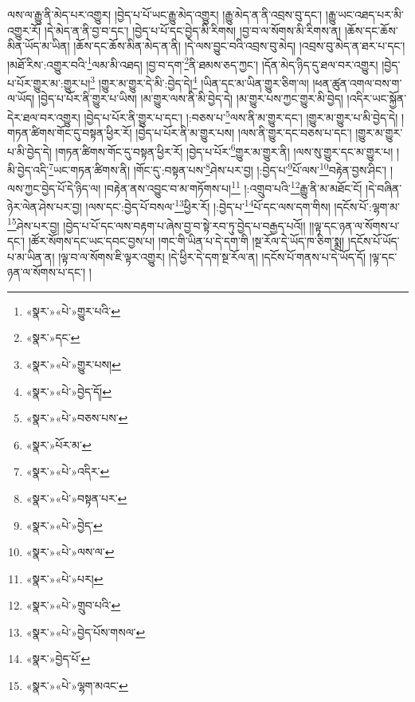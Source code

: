 ལས་ལ་རྒྱུ་ནི་མེད་པར་འགྱུར། །བྱེད་པ་པོ་ཡང་རྒྱུ་མེད་འགྱུར། །རྒྱུ་མེད་ན་ནི་འབྲས་བུ་དང་། །རྒྱུ་ཡང་འཐད་པར་མི་འགྱུར་རོ། །དེ་མེད་ན་ནི་བྱ་བ་དང་། །བྱེད་པ་པོ་དང་བྱེད་མི་རིགས། །བྱ་བ་ལ་སོགས་མི་རིགས་ན། །ཆོས་དང་ཆོས་མིན་ཡོད་མ་ཡིན། །ཆོས་དང་ཆོས་མིན་མེད་ན་ནི། །དེ་ལས་བྱུང་བའི་འབྲས་བུ་མེད། །འབྲས་བུ་མེད་ན་ཐར་པ་དང་། །མཐོ་རིས་:འགྱུར་བའི་\footnote{«སྣར་»«པེ་»གྱུར་པའི་}ལམ་མི་འཐད། །བྱ་བ་དག་\footnote{«སྣར་»དང་}ནི་ཐམས་ཅད་ཀྱང་། །དོན་མེད་ཉིད་དུ་ཐལ་བར་འགྱུར། །བྱེད་པ་པོར་གྱུར་མ་:གྱུར་པ།\footnote{«སྣར་»«པེ་»གྱུར་པས།} །གྱུར་མ་གྱུར་དེ་མི་:བྱེད་དེ།\footnote{«སྣར་»«པེ་»བྱེད་དོ།} །ཡིན་དང་མ་ཡིན་གྱུར་ཅིག་ལ། །ཕན་ཚུན་འགལ་བས་ག་ལ་ཡོད། །བྱེད་པ་པོར་ནི་གྱུར་པ་ཡིས། །མ་གྱུར་ལས་ནི་མི་བྱེད་དེ། །མ་གྱུར་པས་ཀྱང་གྱུར་མི་བྱེད། །འདིར་ཡང་སྐྱོན་དེར་ཐལ་བར་འགྱུར། །བྱེད་པ་པོར་ནི་གྱུར་པ་དང་། །:བཅས་པ་\footnote{«སྣར་»«པེ་»བཅས་པས་}ལས་ནི་མ་གྱུར་དང་། །གྱུར་མ་གྱུར་པ་མི་བྱེད་དེ། །གཏན་ཚིགས་གོང་དུ་བསྟན་ཕྱིར་རོ། །བྱེད་པ་པོར་ནི་མ་གྱུར་པས། །ལས་ནི་གྱུར་དང་བཅས་པ་དང་། །གྱུར་མ་གྱུར་པ་མི་བྱེད་དེ། །གཏན་ཚིགས་གོང་དུ་བསྟན་ཕྱིར་རོ། །བྱེད་པ་པོར་\footnote{«སྣར་»པོར་མ་}གྱུར་མ་གྱུར་ནི། །ལས་སུ་གྱུར་དང་མ་གྱུར་པ། །མི་བྱེད་འདི་\footnote{«སྣར་»«པེ་»འདིར་}ཡང་གཏན་ཚིགས་ནི། །གོང་དུ་:བསྟན་པས་\footnote{«སྣར་»«པེ་»བསྟན་པར་}ཤེས་པར་བྱ། །:བྱེད་པ་\footnote{«སྣར་»«པེ་»བྱེད་}པོ་ལས་\footnote{«སྣར་»«པེ་»ལས་ལ་}བརྟེན་བྱས་ཤིང་། །ལས་ཀྱང་བྱེད་པོ་དེ་ཉིད་ལ། །བརྟེན་ནས་འབྱུང་བ་མ་གཏོགས་པ།\footnote{«སྣར་»«པེ་»པར།} །:འགྲུབ་པའི་\footnote{«སྣར་»«པེ་»གྲུབ་པའི་}རྒྱུ་ནི་མ་མཐོང་ངོ། །དེ་བཞིན་ཉེར་ལེན་ཤེས་པར་བྱ། །ལས་དང་:བྱེད་པོ་བསལ་\footnote{«སྣར་»«པེ་»བྱེད་པོས་གསལ་}ཕྱིར་རོ། །:བྱེད་པ་\footnote{«སྣར་»བྱེད་པོ་}པོ་དང་ལས་དག་གིས། །དངོས་པོ་:ལྷག་མ་\footnote{«སྣར་»«པེ་»ལྷག་མའང་}ཤེས་པར་བྱ། །བྱེད་པ་པོ་དང་ལས་བརྟག་པ་ཞེས་བྱ་བ་སྟེ་རབ་ཏུ་བྱེད་པ་བརྒྱད་པའོ།། །།ལྟ་དང་ཉན་ལ་སོགས་པ་དང་། །ཚོར་སོགས་དང་ཡང་དབང་བྱས་པ། །གང་གི་ཡིན་པ་དེ་དག་གི །སྔ་རོལ་དེ་ཡོད་ཁ་ཅིག་སྨྲ། །དངོས་པོ་ཡོད་པ་མ་ཡིན་ན། །ལྟ་བ་ལ་སོགས་ཇི་ལྟར་འགྱུར། །དེ་ཕྱིར་དེ་དག་སྔ་རོལ་ན། །དངོས་པོ་གནས་པ་དེ་ཡོད་དོ། །ལྟ་དང་ཉན་ལ་སོགས་པ་དང་། །

